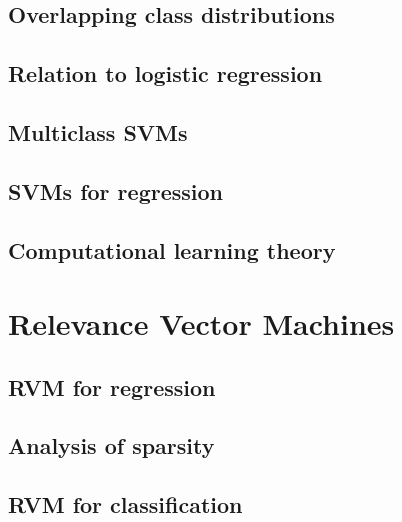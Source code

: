 \documentclass[twoside]{article}
\begin{document}
\subsection{Overlapping class distributions}

\subsection{Relation to logistic regression}

\subsection{Multiclass SVMs}

\subsection{SVMs for regression}

\subsection{Computational learning theory}


\section{Relevance Vector Machines} 

\subsection{RVM for regression}

\subsection{Analysis of sparsity}

\subsection{RVM for classification}

\end{document}
